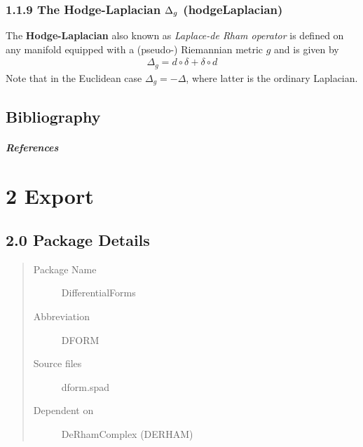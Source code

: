 \documentclass[letterpaper,10pt,english]{sphinxmanual}
\begin{document}
\subsection{1.1.9 The Hodge-Laplacian \protect\(\Delta_g\protect\) (\textbf{hodgeLaplacian})}
\label{section-1.0:the-hodge-laplacian-hodgelaplacian}
The \textbf{Hodge-Laplacian} also known as \emph{Laplace-de Rham operator} is
defined on any manifold equipped with a (pseudo-) Riemannian
metric \(g\) and is given by
\begin{equation*}
\begin{split}\Delta_g = d\circ\delta + \delta\circ d\end{split}
\end{equation*}
Note that in the Euclidean case \(\Delta_g = - \Delta\), where
latter is the ordinary Laplacian.


\section{Bibliography}
\label{section-1.0:bibliography}\paragraph{References}


\chapter{2 Export}
\label{section-2.0:export}\label{section-2.0::doc}

\section{2.0 Package Details}
\label{section-2.0:package-details}\begin{quote}\begin{description}
\item[{Package Name}] \leavevmode
DifferentialForms

\item[{Abbreviation}] \leavevmode
DFORM

\item[{Source files}] \leavevmode
dform.spad

\item[{Dependent on}] \leavevmode
DeRhamComplex (DERHAM)

\end{description}\end{quote}
\end{document}
